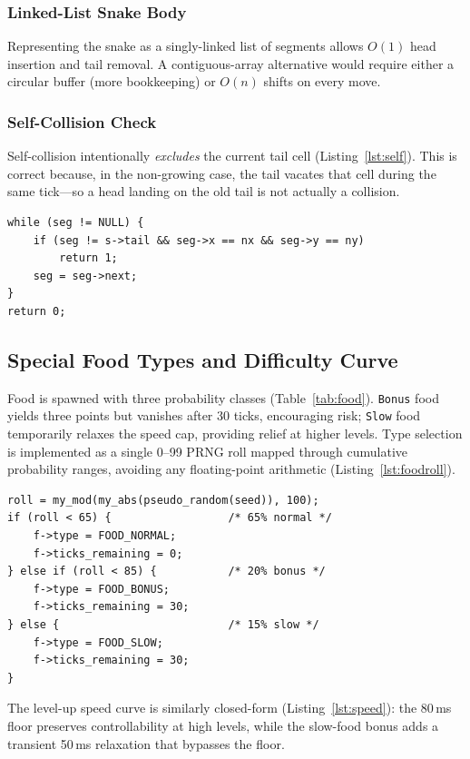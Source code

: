 \documentclass[conference]{IEEEtran}
\begin{document}
\subsubsection{Linked-List Snake Body}
Representing the snake as a singly-linked list of segments allows $O(1)$ head insertion and tail removal. A contiguous-array alternative would require either a circular buffer (more bookkeeping) or $O(n)$ shifts on every move.

\subsubsection{Self-Collision Check}
Self-collision intentionally \emph{excludes} the current tail cell (Listing~\ref{lst:self}). This is correct because, in the non-growing case, the tail vacates that cell during the same tick---so a head landing on the old tail is not actually a collision.

\begin{lstlisting}[caption={Tail-aware self-collision check.},label={lst:self}]
while (seg != NULL) {
    if (seg != s->tail && seg->x == nx && seg->y == ny)
        return 1;
    seg = seg->next;
}
return 0;
\end{lstlisting}

\subsection{Special Food Types and Difficulty Curve}
Food is spawned with three probability classes (Table~\ref{tab:food}). \texttt{Bonus} food yields three points but vanishes after 30 ticks, encouraging risk; \texttt{Slow} food temporarily relaxes the speed cap, providing relief at higher levels. Type selection is implemented as a single 0--99 PRNG roll mapped through cumulative probability ranges, avoiding any floating-point arithmetic (Listing~\ref{lst:foodroll}).

\begin{lstlisting}[caption={Floating-point-free probabilistic food selection.},label={lst:foodroll}]
roll = my_mod(my_abs(pseudo_random(seed)), 100);
if (roll < 65) {                  /* 65% normal */
    f->type = FOOD_NORMAL;
    f->ticks_remaining = 0;
} else if (roll < 85) {           /* 20% bonus */
    f->type = FOOD_BONUS;
    f->ticks_remaining = 30;
} else {                          /* 15% slow */
    f->type = FOOD_SLOW;
    f->ticks_remaining = 30;
}
\end{lstlisting}

The level-up speed curve is similarly closed-form (Listing~\ref{lst:speed}): the 80\,ms floor preserves controllability at high levels, while the slow-food bonus adds a transient 50\,ms relaxation that bypasses the floor.
\end{document}

